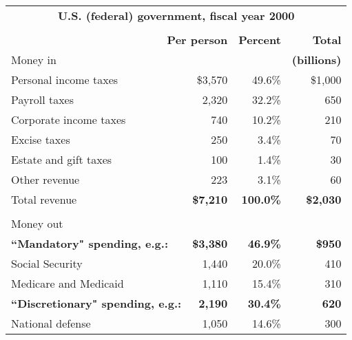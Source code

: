 \begin{table}%
\begin{center}
\begin{tabular}{lrrr}
\multicolumn{4}{c}{\bf U.S. (federal) government, fiscal year 2000} \\ %
& & & \\ %
\multicolumn{2}{r}{\bf Per person} & \bf Percent & \bf Total \\ %
\sc Money in & & & \multicolumn{1}{c}{\small \bf (billions)} \\ %
\hspace{.1cm} Personal income taxes & \$3,570 & 49.6\% & \$1,000 \\
\hspace{.1cm} Payroll taxes & 2,320 & 32.2\% & 650 \\
\hspace{.1cm} Corporate income taxes & 740 & 10.2\% & 210 \\
\hspace{.1cm} Excise taxes & 250 & 3.4\% & 70 \\
\hspace{.1cm} Estate and gift taxes & 100 & 1.4\% & 30 \\
\hspace{.1cm} Other revenue & 223 & 3.1\% & 60 \\ %
\sc Total revenue & \bf \$7,210 & \bf 100.0\% & \bf \$2,030 \\ %
& & & \\ %
\sc Money out & & & \\ %
\hspace{.1cm} \bf\small ``Mandatory" spending\rm, e.g.: & \bf\small \$3,380 & \bf\small 46.9\% & \bf\small \$950 \\ %
\hspace{.4cm} Social Security & 1,440 & 20.0\% & 410 \\
\hspace{.4cm} Medicare and Medicaid & 1,110 & 15.4\% & 310 \\
\hspace{.1cm} \bf\small ``Discretionary" spending\rm, e.g.: & \bf\small 2,190 & \bf\small 30.4\% & \bf\small 620 \\ %
\hspace{.4cm} National defense & 1,050 & 14.6\% & 300 \\

\end{tabular}
\end{center}
\end{table}
